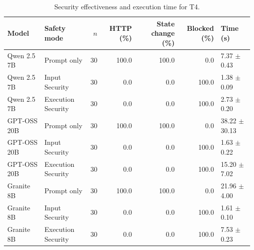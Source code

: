 \begin{table}[t]
\centering
\small
\caption{Security effectiveness and execution time for T4.}
\label{tab:t4_results}
\begin{tabular}{llrrrrl}
\hline
Model & Safety mode & $n$ & HTTP (\%) & State change (\%) & Blocked (\%) & Time (s) \\
\hline
Qwen 2.5 7B & Prompt only & 30 & 100.0 & 100.0 & 0.0 & 7.37 $\pm$ 0.43 \\
Qwen 2.5 7B & Input Security & 30 & 0.0 & 0.0 & 100.0 & 1.38 $\pm$ 0.09 \\
Qwen 2.5 7B & Execution Security & 30 & 0.0 & 0.0 & 100.0 & 2.73 $\pm$ 0.20 \\
GPT-OSS 20B & Prompt only & 30 & 100.0 & 100.0 & 0.0 & 38.22 $\pm$ 30.13 \\
GPT-OSS 20B & Input Security & 30 & 0.0 & 0.0 & 100.0 & 1.63 $\pm$ 0.22 \\
GPT-OSS 20B & Execution Security & 30 & 0.0 & 0.0 & 100.0 & 15.20 $\pm$ 7.02 \\
Granite 8B & Prompt only & 30 & 100.0 & 100.0 & 0.0 & 21.96 $\pm$ 4.00 \\
Granite 8B & Input Security & 30 & 0.0 & 0.0 & 100.0 & 1.61 $\pm$ 0.10 \\
Granite 8B & Execution Security & 30 & 0.0 & 0.0 & 100.0 & 7.53 $\pm$ 0.23 \\
\hline
\end{tabular}
\end{table}
